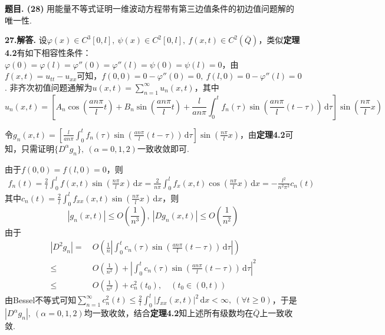 \documentclass[12pt, a4paper, oneside]{ctexart}
\newcounter{problem}  %
\newenvironment{problem}[1][]{\stepcounter{problem}\par\noindent\textbf{题目\arabic{problem}. #1}}{\smallskip\par}
\newenvironment{solution}[1][]{\par\noindent\textbf{#1解答. }}{\smallskip\par}  %
\let\leq=\leqslant %
\let\geq=\geqslant %
\def\d{\mathrm{d}}          %
\def\add{\vspace{1ex}}      %
\begin{document}
\begin{problem}[(28)]
    用能量不等式证明一维波动方程带有第三边值条件的初边值问题解的唯一性.
\end{problem}
\clearpage
\begin{solution}[27.]
    设$\varphi(x)\in C^3[0,l],\ \psi(x)\in C^2[0,l],\ f(x,t)\in C^2(\bar{Q})$，类似\textbf{定理4.2}有如下相容性条件：$\varphi(0)=\varphi(l)=\varphi''(0)=\varphi''(l) = \psi(0) = \psi(l) = 0$，由$f(x,t) = u_{tt}-u_{xx}$可知，$f(0,0) = 0-\varphi''(0) = 0,\ f(l,0) = 0-\varphi''(l) = 0$. 非齐次初值问题通解为$u(x,t) = \sum_{n=1}^\infty u_n(x,t)$，其中
    \begin{equation*}
        u_n(x,t) = \left[A_n\cos\left(\frac{an\pi}{l}t\right)+B_n\sin\left(\frac{an\pi}{l}t\right)+\frac{l}{an\pi}\int_0^tf_n(\tau)\sin\left(\frac{an\pi}{l}(t-\tau)\right)\,\d\tau\right]\sin\left(\frac{n\pi}{l}x\right)
    \end{equation*}

    令$g_n(x,t) =\left[\frac{l}{an\pi}\int_0^tf_n(\tau)\sin\left(\frac{an\pi}{l}(t-\tau)\right)\,\d\tau\right]\sin\left(\frac{n\pi}{l}x\right)$，\add 由\textbf{定理4.2}可知，只需证明$\{D^{\alpha}g_n\},\ (\alpha=0,1,2)$一致收敛即可.

    由于$f(0,0) = f(l,0) = 0$，则
    \begin{align*}
        f_n(t) = \frac{2}{l}\int_0^lf(x,t)\sin\left(\frac{n\pi}{l}x\right)\,\d x = \frac{2}{n\pi}\int_0^lf_x(x,t)\cos\left(\frac{n\pi}{l}x\right)\,\d x = -\frac{l^2}{n^2\pi^2}c_n(t)
    \end{align*}
    其中$c_n(t) = \frac{2}{l}\int_0^l f_{xx}(x,t)\sin\left(\frac{n\pi}{l}x\right)\,\d x$，则
    \begin{equation*}
        |g_n(x,t)|\leq O\left(\frac{1}{n^3}\right),\ |Dg_n(x,t)|\leq O\left(\frac{1}{n^2}\right)
    \end{equation*}
    由于
    \begin{align*}
        |D^2g_n|=&\ O\left(\frac{1}{n}\left|\int_0^tc_n(\tau)\sin\left(\frac{an\pi}{l}(t-\tau)\right)\,\d\tau\right|\right)\\
        \leq&\ O\left(\frac{1}{n^2}\right)+\left|\int_0^t c_n(\tau)\sin\left(\frac{an\pi}{l}(t-\tau)\right)\,\d \tau\right|^2\\
        \leq&\ O\left(\frac{1}{n^2}\right)+c_n^2(t_0),\quad(t_0\in (0,t))
    \end{align*}
    由Bessel不等式可知$\sum_{n=1}^\infty c_n^2(t)\leq \frac{2}{l}\int_0^l|f_{xx}(x,t)|^2\,\d x <\infty,\ (\forall t\geq 0)$，于是$|D^\alpha g_n|,\ (\alpha=0,1,2)$均一致收敛，结合\textbf{定理4.2}知上述所有级数均在$\bar{Q}$上一致收敛.
\end{solution}
\end{document}
